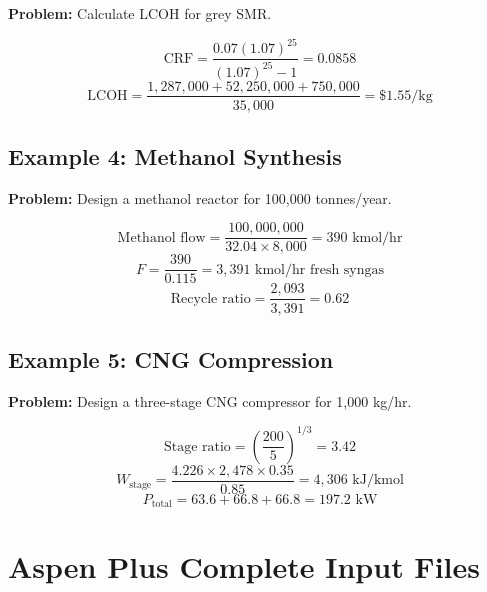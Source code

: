 \documentclass[12pt,twoside,openany]{book}
\begin{document}
\textbf{Problem:} Calculate LCOH for grey SMR.

\begin{dmath}
\text{CRF} = \frac{0.07(1.07)^{25}}{(1.07)^{25}-1} = 0.0858
\end{dmath}
\begin{dmath}
\text{LCOH} = \frac{1{,}287{,}000 + 52{,}250{,}000 + 750{,}000}{35{,}000}
            = \$1.55/\text{kg}
\end{dmath}

\section{Example 4: Methanol Synthesis}

\textbf{Problem:} Design a methanol reactor for 100,000 tonnes/year.

\begin{dmath}
\text{Methanol flow} = \frac{100{,}000{,}000}{32.04 \times 8{,}000}
                     = 390\text{ kmol/hr}
\end{dmath}
\begin{dmath}
F = \frac{390}{0.115} = 3{,}391\text{ kmol/hr fresh syngas}
\end{dmath}
\begin{dmath}
\text{Recycle ratio} = \frac{2{,}093}{3{,}391} = 0.62
\end{dmath}

\section{Example 5: CNG Compression}

\textbf{Problem:} Design a three-stage CNG compressor for 1,000 kg/hr.

\begin{dmath}
\text{Stage ratio} = \left(\frac{200}{5}\right)^{1/3} = 3.42
\end{dmath}
\begin{dmath}
W_{\text{stage}} = \frac{4.226 \times 2{,}478 \times 0.35}{0.85}
                 = 4{,}306\text{ kJ/kmol}
\end{dmath}
\begin{dmath}
P_{\text{total}} = 63.6 + 66.8 + 66.8 = 197.2\text{ kW}
\end{dmath}


\chapter{Aspen Plus Complete Input Files}
\end{document}
